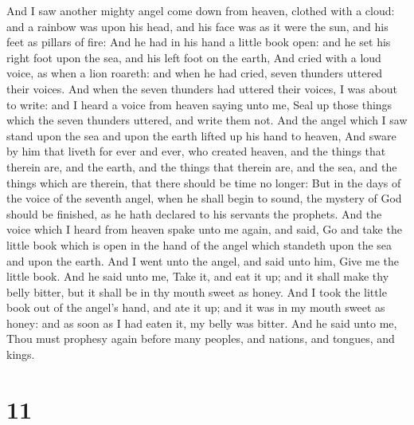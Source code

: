  And I saw another mighty angel come down from heaven,
clothed with a cloud: and a rainbow was upon his head, and his face was
as it were the sun, and his feet as pillars of fire:  And he
had in his hand a little book open: and he set his right foot upon the
sea, and his left foot on the earth,  And cried with a loud
voice, as when a lion roareth: and when he had cried, seven thunders
uttered their voices.  And when the seven thunders had
uttered their voices, I was about to write: and I heard a voice from
heaven saying unto me, Seal up those things which the seven thunders
uttered, and write them not.  And the angel which I saw
stand upon the sea and upon the earth lifted up his hand to heaven,
 And sware by him that liveth for ever and ever, who created
heaven, and the things that therein are, and the earth, and the things
that therein are, and the sea, and the things which are therein, that
there should be time no longer:  But in the days of the
voice of the seventh angel, when he shall begin to sound, the mystery of
God should be finished, as he hath declared to his servants the
prophets.  And the voice which I heard from heaven spake
unto me again, and said, Go and take the little book which is open in
the hand of the angel which standeth upon the sea and upon the earth.
 And I went unto the angel, and said unto him, Give me the
little book. And he said unto me, Take it, and eat it up; and it shall
make thy belly bitter, but it shall be in thy mouth sweet as honey.
 And I took the little book out of the angel's hand, and
ate it up; and it was in my mouth sweet as honey: and as soon as I had
eaten it, my belly was bitter.  And he said unto me, Thou
must prophesy again before many peoples, and nations, and tongues, and
kings.

\hypertarget{section-10}{%
\section{11}\label{section-10}}

